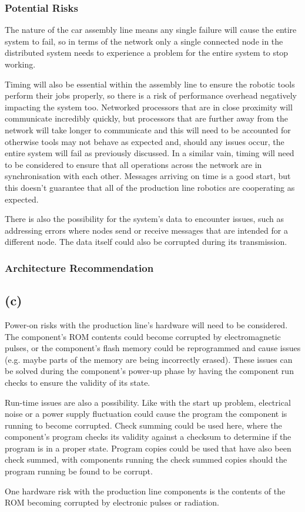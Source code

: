 \documentclass[]{report}
\begin{document}
				\subsubsection{Potential Risks}
				The nature of the car assembly line means any single failure will cause the entire system to fail, so in terms of the network only a single connected node in the distributed system needs to experience a problem for the entire system to stop working. 
				
				Timing will also be essential within the assembly line to ensure the robotic tools perform their jobs properly, so there is a risk of performance overhead negatively impacting the system too. Networked processors that are in close proximity will communicate incredibly quickly, but processors that are further away from the network will take longer to communicate and this will need to be accounted for otherwise tools may not behave as expected and, should any issues occur, the entire system will fail as previously discussed. In a similar vain, timing will need to be considered to ensure that all operations across the network are in synchronisation with each other. Messages arriving on time is a good start, but this doesn't guarantee that all of the production line robotics are cooperating as expected.
				
				There is also the possibility for the system's data to encounter issues, such as addressing errors where nodes send or receive messages that are intended for a different node. The data itself could also be corrupted during its transmission.
				
				\subsubsection{Architecture Recommendation}
						
			
			\subsection{(c)}
			Power-on risks with the production line's hardware will need to be considered. The component's ROM contents could become corrupted by electromagnetic pulses, or the component's flash memory could be reprogrammed and cause issues (e.g. maybe parts of the memory are being incorrectly erased). These issues can be solved during the component's power-up phase by having the component run checks to ensure the validity of its state.
			
			Run-time issues are also a possibility. Like with the start up problem, electrical noise or a power supply fluctuation could cause the program the component is running to become corrupted. Check summing could be used here, where the component's program checks its validity against a checksum to determine if the program is in a proper state. Program copies could be used that have also been check summed, with components running the check summed copies should the program running be found to be corrupt.
			
			One hardware risk with the production line components is the contents of the ROM becoming corrupted by electronic pulses or radiation.


	
	
\end{document}
